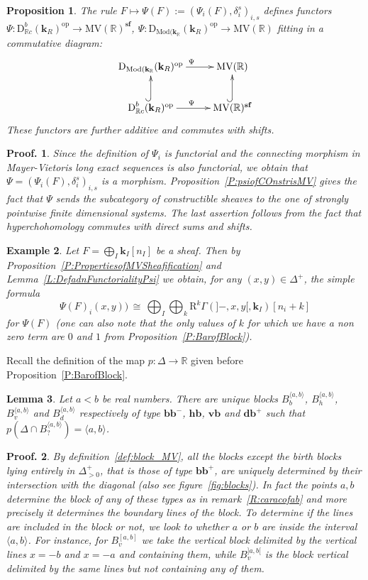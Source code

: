 \documentclass[a4paper, english, 11pt]{article}
\newcommand{\kk}[0]{\textbf{k}}
\newcommand{\Mod}[0]{\text{Mod}}
\newcommand{\0}{\vec{0}}
\newcommand{\R}[0]{\mathbb{R}}
\newcommand{\D}[0]{\text{D}}
\newcommand{\op}[0]{\text{op}}
\newcommand{\Rr}[0]{\text{R}}
\newcommand{\MV}{\text{MV}}
\newcommand{\s}{\textbf{sf}}
\newtheorem{prop}{Proposition}[section]
\newtheorem*{pf}{Proof.} }
\newtheorem{ex}[prop]{Example}
\newtheorem{lem}[prop]{Lemma}
\begin{document}
\begin{prop}\label{P:PropertiesofPsi}
The rule $F\mapsto \Psi(F):= (\Psi_i(F), \delta_i^s)_{i,s}$ defines  functors $\Psi: \D^b_{\R c}(\kk_R)^{\op}\to \MV(\R)^\s$,  $\Psi: \D_{\Mod(\kk_{\R}}(\kk_R)^{\op}\to \MV(\R)$ fitting in a commutative diagram: 
\[\xymatrix{ \D_{\Mod(\kk_{\R}}(\kk_R)^{\op}\ar[r]^{\Psi} & \MV(\R)\\ 
\D^b_{\R c}(\kk_R)^{\op}\ar[r]^{\Psi} \ar@{^{(}->}[u]& \MV(\R)^\s  \ar@{^{(}->}[u].} \]
These functors are further additive and commutes with shifts.
\end{prop}
\begin{pf} Since the definition of $\Psi_i$ is functorial  and the connecting morphism in Mayer-Vietoris long exact sequences is also functorial, we obtain  that $\Psi= (\Psi_i(F), \delta^s_i)_{i,s}$ is a morphism. Proposition~\ref{P:psiofCOnstrisMV} gives the fact that $\Psi$ sends the subcategory of constructible sheaves to the one of strongly pointwise finite dimensional systems.  The last assertion follows from the fact that hyperchohomology commutes with direct sums and shifts. 
\end{pf}
\begin{ex}\label{ex:ValueofPsiondirectsum}
 Let $F =\bigoplus_{I} \kk_I[n_I]$ be a sheaf. Then by Proposition~\ref{P:PropertiesofMVSheafification} and Lemma~\ref{L:DefadnFunctorialityPsi} we obtain, for any $(x,y)\in \Delta^+$, the simple formula 
 $$\Psi(F)_i (x,y) ) \, \cong \, \bigoplus_{I} \bigoplus_{k} \Rr^k\Gamma\left(]-,x,y[, \kk_I\right)[n_i+k]$$ for $\Psi(F)$ (one can also note that the only values of $k$ for which we have a non zero term are $0$ and $1$ from Proposition~\ref{P:BarofBlock}).
\end{ex}



Recall the definition of the map $p: \Delta\to \R$ given before Proposition~\ref{P:BarofBlock}.
\begin{lem}\label{L:Blockassociatedtointerval}
 Let  $a<b$ be real numbers. There are unique  blocks $B_{b}^{\langle a, b\rangle}$, $B_{h}^{\langle a, b\rangle}$, $B_{v}^{\langle a, b\rangle}$ and $B_{d}^{\langle a, b\rangle}$ respectively of type $\textbf{bb}^{-}$, $\textbf{hb}$, $\textbf{vb}$ and $\textbf{db}^+$ such that $p(\Delta\cap B_{?}^{\langle a, b\rangle}) = \langle a,b \rangle$. 
\end{lem}
\begin{pf}
By definition~\ref{def:block_MV}, all the blocks except the birth blocks lying entirely in $\Delta^+_{>0}$, that is those of type $\textbf{bb}^{+}$,  are uniquely determined by their intersection with the diagonal (also see figure~\ref{fig:blocks}). In fact the points $a, b$ determine the block of any of these types as in remark~\ref{R:caracofab} and more precisely it determines the boundary lines of the block. To determine if the lines are included in the block or not, we look to whether $a$ or $b$ are inside the interval $\langle a, b\rangle$. For instance, for $B_v^{[a,b]}$ we take the vertical block delimited by the vertical lines $x=-b$ and $x=-a$ and containing them, while $B_v^{]a,b[}$ is the block vertical delimited by the same lines but not containing any of them. 
\end{pf}
\end{document}
